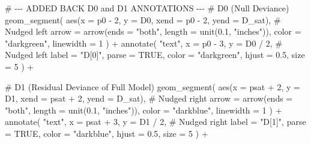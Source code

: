\documentclass[
  letterpaper,
  DIV=11,
  numbers=noendperiod]{scrreprt}
\newenvironment{Shaded}{\begin{snugshade}}{\end{snugshade}}
\newcommand{\AttributeTok}[1]{\textcolor[rgb]{0.40,0.45,0.13}{#1}}
\newcommand{\CommentTok}[1]{\textcolor[rgb]{0.37,0.37,0.37}{#1}}
\newcommand{\ConstantTok}[1]{\textcolor[rgb]{0.56,0.35,0.01}{#1}}
\newcommand{\DecValTok}[1]{\textcolor[rgb]{0.68,0.00,0.00}{#1}}
\newcommand{\FloatTok}[1]{\textcolor[rgb]{0.68,0.00,0.00}{#1}}
\newcommand{\FunctionTok}[1]{\textcolor[rgb]{0.28,0.35,0.67}{#1}}
\newcommand{\NormalTok}[1]{\textcolor[rgb]{0.00,0.23,0.31}{#1}}
\newcommand{\SpecialCharTok}[1]{\textcolor[rgb]{0.37,0.37,0.37}{#1}}
\newcommand{\StringTok}[1]{\textcolor[rgb]{0.13,0.47,0.30}{#1}}
\begin{document}
\begin{Shaded}
\begin{Highlighting}[]
  \CommentTok{\# {-}{-}{-} ADDED BACK D0 and D1 ANNOTATIONS {-}{-}{-}}
  \CommentTok{\# D0 (Null Deviance)}
  \FunctionTok{geom\_segment}\NormalTok{(}
    \FunctionTok{aes}\NormalTok{(}\AttributeTok{x =}\NormalTok{ p0 }\SpecialCharTok{{-}} \DecValTok{2}\NormalTok{, }\AttributeTok{y =}\NormalTok{ D0, }\AttributeTok{xend =}\NormalTok{ p0 }\SpecialCharTok{{-}} \DecValTok{2}\NormalTok{, }\AttributeTok{yend =}\NormalTok{ D\_sat), }\CommentTok{\# Nudged left}
    \AttributeTok{arrow =} \FunctionTok{arrow}\NormalTok{(}\AttributeTok{ends =} \StringTok{"both"}\NormalTok{, }\AttributeTok{length =} \FunctionTok{unit}\NormalTok{(}\FloatTok{0.1}\NormalTok{, }\StringTok{"inches"}\NormalTok{)),}
    \AttributeTok{color =} \StringTok{"darkgreen"}\NormalTok{,}
    \AttributeTok{linewidth =} \DecValTok{1}
\NormalTok{  ) }\SpecialCharTok{+}
  \FunctionTok{annotate}\NormalTok{(}
    \StringTok{"text"}\NormalTok{,}
    \AttributeTok{x =}\NormalTok{ p0 }\SpecialCharTok{{-}} \DecValTok{3}\NormalTok{, }\AttributeTok{y =}\NormalTok{ D0 }\SpecialCharTok{/} \DecValTok{2}\NormalTok{, }\CommentTok{\# Nudged left}
    \AttributeTok{label =} \StringTok{"D[0]"}\NormalTok{, }\AttributeTok{parse =} \ConstantTok{TRUE}\NormalTok{,}
    \AttributeTok{color =} \StringTok{"darkgreen"}\NormalTok{, }\AttributeTok{hjust =} \FloatTok{0.5}\NormalTok{, }\AttributeTok{size =} \DecValTok{5}
\NormalTok{  ) }\SpecialCharTok{+}
  
  \CommentTok{\# D1 (Residual Deviance of Full Model)}
  \FunctionTok{geom\_segment}\NormalTok{(}
    \FunctionTok{aes}\NormalTok{(}\AttributeTok{x =}\NormalTok{ psat }\SpecialCharTok{+} \DecValTok{2}\NormalTok{, }\AttributeTok{y =}\NormalTok{ D1, }\AttributeTok{xend =}\NormalTok{ psat }\SpecialCharTok{+} \DecValTok{2}\NormalTok{, }\AttributeTok{yend =}\NormalTok{ D\_sat), }\CommentTok{\# Nudged right}
    \AttributeTok{arrow =} \FunctionTok{arrow}\NormalTok{(}\AttributeTok{ends =} \StringTok{"both"}\NormalTok{, }\AttributeTok{length =} \FunctionTok{unit}\NormalTok{(}\FloatTok{0.1}\NormalTok{, }\StringTok{"inches"}\NormalTok{)),}
    \AttributeTok{color =} \StringTok{"darkblue"}\NormalTok{,}
    \AttributeTok{linewidth =} \DecValTok{1}
\NormalTok{  ) }\SpecialCharTok{+}
  \FunctionTok{annotate}\NormalTok{(}
    \StringTok{"text"}\NormalTok{,}
    \AttributeTok{x =}\NormalTok{ psat }\SpecialCharTok{+} \DecValTok{3}\NormalTok{, }\AttributeTok{y =}\NormalTok{ D1 }\SpecialCharTok{/} \DecValTok{2}\NormalTok{, }\CommentTok{\# Nudged right}
    \AttributeTok{label =} \StringTok{"D[1]"}\NormalTok{, }\AttributeTok{parse =} \ConstantTok{TRUE}\NormalTok{,}
    \AttributeTok{color =} \StringTok{"darkblue"}\NormalTok{, }\AttributeTok{hjust =} \FloatTok{0.5}\NormalTok{, }\AttributeTok{size =} \DecValTok{5}
\NormalTok{  ) }\SpecialCharTok{+}
  

\end{Highlighting}
\end{Shaded}
\end{document}
